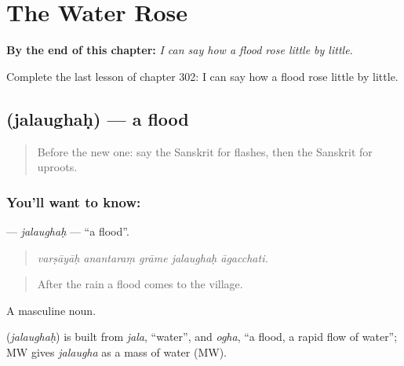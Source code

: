 
\chapter{The Water Rose}
\label{ch:sa-the-water-rose}

\begin{chapteropening}
\textbf{By the end of this chapter:} \emph{I can say how a flood rose little by little.}

Complete the last lesson of chapter 302: I can say how a flood rose little by little.
\end{chapteropening}

\section[\texorpdfstring{\sk{जलौघः} (jalaughaḥ)}{जलौघः (jalaughaḥ)}]{ (jalaughaḥ) — a flood}

\label{lesson:SA-C302-jalaughah}



\begin{quote}
Before the new one: say the Sanskrit for flashes, then the Sanskrit for uproots.
\end{quote}

\subsection*{You'll want to know: }
\textbf{} — \emph{jalaughaḥ} — \textquotedblleft{}a flood\textquotedblright{}.

\begin{quote}
    
\end{quote}

\begin{quote}
\emph{varṣāyāḥ anantaraṃ grāme jalaughaḥ āgacchati.}
\end{quote}

\begin{quote}
After the rain a flood comes to the village.
\end{quote}

A masculine noun.

\begin{cousinweb}
\textbf{} (\emph{jalaughaḥ}) is built from \emph{jala}, \textquotedblleft{}water\textquotedblright{}, and \emph{ogha}, \textquotedblleft{}a flood, a rapid flow of water\textquotedblright{}; MW gives \emph{jalaugha} as a mass of water (MW).
\end{cousinweb}


